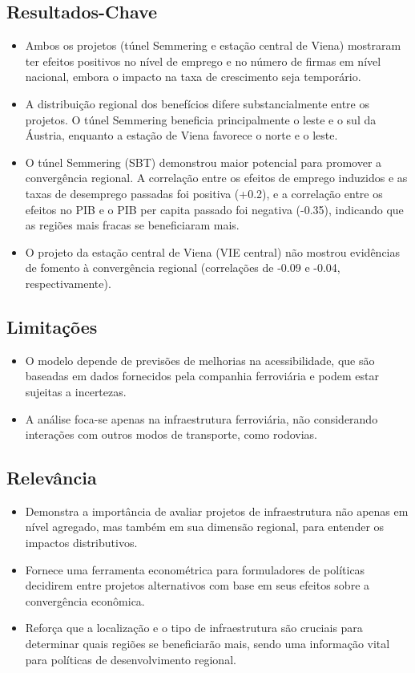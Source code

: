 \documentclass[12pt]{article}
\begin{document}
\subsection*{Resultados-Chave}
\begin{itemize}
    \item Ambos os projetos (túnel Semmering e estação central de Viena) mostraram ter efeitos positivos no nível de emprego e no número de firmas em nível nacional, embora o impacto na taxa de crescimento seja temporário.
    \item A distribuição regional dos benefícios difere substancialmente entre os projetos. O túnel Semmering beneficia principalmente o leste e o sul da Áustria, enquanto a estação de Viena favorece o norte e o leste.
    \item O túnel Semmering (SBT) demonstrou maior potencial para promover a convergência regional. A correlação entre os efeitos de emprego induzidos e as taxas de desemprego passadas foi positiva (+0.2), e a correlação entre os efeitos no PIB e o PIB per capita passado foi negativa (-0.35), indicando que as regiões mais fracas se beneficiaram mais.
    \item O projeto da estação central de Viena (VIE central) não mostrou evidências de fomento à convergência regional (correlações de -0.09 e -0.04, respectivamente).
\end{itemize}

\subsection*{Limitações}
\begin{itemize}
    \item O modelo depende de previsões de melhorias na acessibilidade, que são baseadas em dados fornecidos pela companhia ferroviária e podem estar sujeitas a incertezas.
    \item A análise foca-se apenas na infraestrutura ferroviária, não considerando interações com outros modos de transporte, como rodovias.
\end{itemize}

\subsection*{Relevância}
\begin{itemize}
    \item Demonstra a importância de avaliar projetos de infraestrutura não apenas em nível agregado, mas também em sua dimensão regional, para entender os impactos distributivos.
    \item Fornece uma ferramenta econométrica para formuladores de políticas decidirem entre projetos alternativos com base em seus efeitos sobre a convergência econômica.
    \item Reforça que a localização e o tipo de infraestrutura são cruciais para determinar quais regiões se beneficiarão mais, sendo uma informação vital para políticas de desenvolvimento regional.
\end{itemize}
\end{document}
